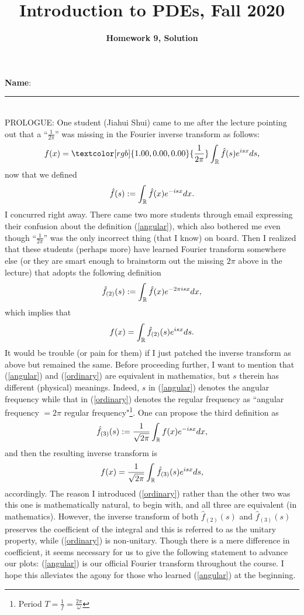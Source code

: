 \documentclass[6pt]{article}
\title{Introduction to PDEs, Fall 2020}
\author{\textbf{Homework 9, Solution}}
\date{}
\numberwithin{equation}{section}
\def\mathbb{\Bbb}
\begin{document}
\maketitle

\textbf{Name}:\rule{1 in}{0.001 in} \\
PROLOGUE:  One student (Jiahui Shui) came to me after the lecture pointing out that a ``$\frac{1}{2\pi}$'' was missing in the Fourier inverse transform as follows:
\[f(x)=\textcolor[rgb]{1.00,0.00,0.00}{\frac{1}{2\pi}}\int_{\mathbb R}\hat f(s)e^{isx}ds,\]
now that we defined
\begin{equation}\label{ordinary}
\hat f(s):=\int_{\mathbb R}\hat f(x)e^{-isx}dx.
\end{equation}
I concurred right away.  There came two more students through email expressing their confusion about the definition (\ref{angular}), which also bothered me even though ``$\frac{1}{2\pi}$'' was the only incorrect thing (that I know) on board.  Then I realized that these students (perhaps more) have learned Fourier transform somewhere else (or they are smart enough to brainstorm out the missing $2\pi$ above in the lecture) that adopts the following definition
\begin{equation}\label{angular}
\hat f_{(2)}(s):=\int_{\mathbb R}\hat f(x)e^{-2\pi isx}dx,
\end{equation}
which implies that
\[f(x)=\int_{\mathbb R}\hat f_{(2)}(s)e^{isx}ds.\]
It would be trouble (or pain for them) if I just patched the inverse transform as above but remained the same.  Before proceeding further, I want to mention that (\ref{angular}) and (\ref{ordinary}) are equivalent in mathematics, but $s$ therein has different (physical) meanings.  Indeed, $s$ in (\ref{angular}) denotes the angular frequency while that in (\ref{ordinary}) denotes the regular frequency as ``angular frequency $=2\pi$ regular frequency"\footnote{Period $T=\frac{1}{f}=\frac{2\pi}{\omega}$}.  One can propose the third definition as
\[\hat f_{(3)}(s):=\frac{1}{\sqrt{2\pi}}\int_{\mathbb R}f(x)e^{- isx}dx,\]
and then the resulting inverse transform is
\[f(x)=\frac{1}{\sqrt{2\pi}}\int_{\mathbb R}\hat f_{(3)}(s)e^{isx}ds,\]
accordingly.  The reason I introduced (\ref{ordinary}) rather than the other two was this one is mathematically natural, to begin with, and all three are equivalent (in mathematics).  However, the inverse transform of both $\hat f_{(2)}(s)$ and $\hat f_{(3)}(s)$ preserves the coefficient of the integral and this is referred to as the unitary property, while (\ref{ordinary}) is non-unitary.  Though there is a mere difference in coefficient, it seems necessary for us to give the following statement to advance our plots: (\ref{angular}) is our official Fourier transform throughout the course.  I hope this alleviates the agony for those who learned (\ref{angular}) at the beginning.
\end{document}
